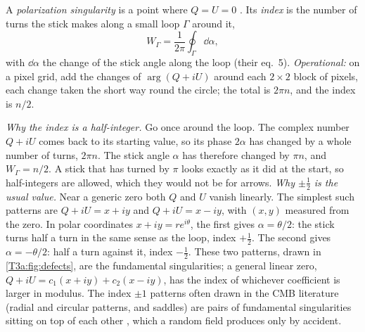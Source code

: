 \begin{workdef}
A \emph{polarization singularity} is a point where $Q=U=0$ . Its \emph{index} is the number of turns the stick makes along a small loop $\Gamma$ around it,
\begin{equation*}
  W_\Gamma=\frac{1}{2\pi}\oint_\Gamma \dd\alpha ,
\end{equation*}
with $\dd\alpha$ the change of the stick angle along the loop \cite{VachaspatiLue2003} (their eq.~5). \emph{Operational:} on a pixel grid, add the changes of $\arg(Q+iU)$ around each $2\times2$ block of pixels, each change taken the short way round the circle; the total is $2\pi n$, and the index is $n/2$.
\end{workdef}

\emph{Why the index is a half-integer.} Go once around the loop. The complex number $Q+iU$ comes back to its starting value, so its phase $2\alpha$ has changed by a whole number of turns, $2\pi n$. The stick angle $\alpha$ has therefore changed by $\pi n$, and $W_\Gamma=n/2$. A stick that has turned by $\pi$ looks exactly as it did at the start, so half-integers are allowed, which they would not be for arrows. \emph{Why $\pm\frac12$ is the usual value.} Near a generic zero both $Q$ and $U$ vanish linearly. The simplest such patterns are $Q+iU=x+iy$ and $Q+iU=x-iy$, with $(x,y)$ measured from the zero. In polar coordinates $x+iy=re^{i\theta}$, the first gives $\alpha=\theta/2$: the stick turns half a turn in the same sense as the loop, index $+\frac12$. The second gives $\alpha=-\theta/2$: half a turn against it, index $-\frac12$. These two patterns, drawn in \cref{T3a:fig:defects}, are the fundamental singularities; a general linear zero, $Q+iU=c_1(x+iy)+c_2(x-iy)$, has the index of whichever coefficient is larger in modulus. The index $\pm1$ patterns often drawn in the CMB literature (radial and circular patterns, and saddles) are pairs of fundamental singularities sitting on top of each other \cite{VachaspatiLue2003,HutererVachaspati2005}, which a random field produces only by accident.

